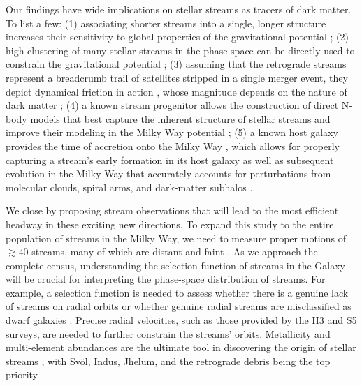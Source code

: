 \documentclass[twocolumn]{aastex63}
\begin{document}
Our findings have wide implications on stellar streams as tracers of dark matter.
To list a few:
(1) associating shorter streams into a single, longer structure increases their sensitivity to global properties of the gravitational potential \citep{bh2018};
(2) high clustering of many stellar streams in the phase space can be directly used to constrain the gravitational potential \citep{sanderson2015, reino2020};
(3) assuming that the retrograde streams represent a breadcrumb trail of satellites stripped in a single merger event, they depict dynamical friction in action \citep[e.g.,][]{chandrasekhar1942, white1978}, whose magnitude depends on the nature of dark matter \citep[e.g.,][]{lancaster2020};
(4) a known stream progenitor allows the construction of direct N-body models that best capture the inherent structure of stellar streams \citep[e.g.,][]{kuepper2008, just2009} and improve their modeling in the Milky Way potential \citep{kuepper2015};
(5) a known host galaxy provides the time of accretion onto the Milky Way \citep[e.g.,][]{kruijssen2020}, which allows for properly capturing a stream's early formation in its host galaxy \citep[e.g.,][]{carlberg2018, malhan2020} as well as subsequent evolution in the Milky Way that accurately accounts for perturbations from molecular clouds, spiral arms, and dark-matter subhalos \citep[e.g.,][]{erkal2016, banik2019}.

We close by proposing stream observations that will lead to the most efficient headway in these exciting new directions.
To expand this study to the entire population of streams in the Milky Way, we need to measure proper motions of $\gtrsim40$ streams, many of which are distant and faint \citep[e.g.,][]{grillmair2009, grillmair2017}.
As we approach the complete census, understanding the selection function of streams in the Galaxy will be crucial for interpreting the phase-space distribution of streams.
For example, a selection function is needed to assess whether there is a genuine lack of streams on radial orbits \citep[as shell rather than stream morphologies are expected on such orbits,][]{hendel2015} or whether genuine radial streams are misclassified as dwarf galaxies \citep[that have anomalously large velocity dispersions and/or distance gradients,][]{kuepper2017}.
Precise radial velocities, such as those provided by the H3 \citep{conroy2019} and S5 \citep{li2019} surveys, are needed to further constrain the streams' orbits.
Metallicity and multi-element abundances are the ultimate tool in discovering the origin of stellar streams \citep[e.g.,][]{hansen2020}, with Sv\" ol, Indus, Jhelum, and the retrograde debris being the top priority.
\end{document}
